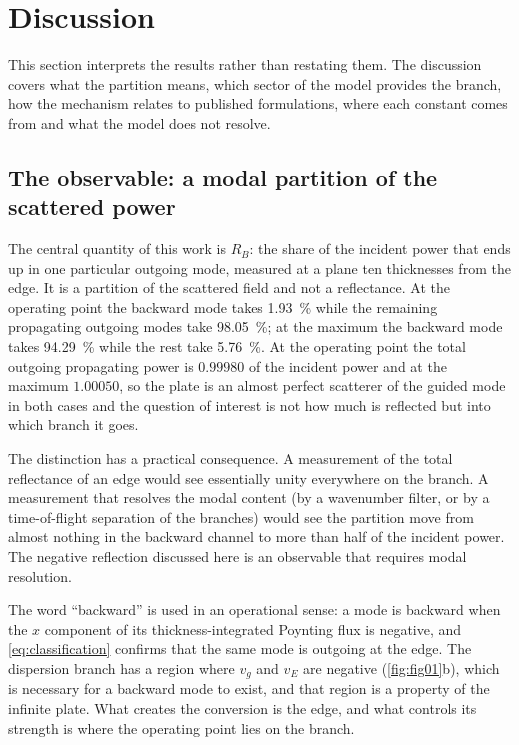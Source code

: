 \section{Discussion}
\label{sec:discussion}

This section interprets the results rather than restating them.  The discussion covers what the partition means, which sector of the model provides the branch, how the
mechanism relates to published formulations, where each constant comes from and
what the model does not resolve.

\subsection{The observable: a modal partition of the scattered power}
\label{sec:disc_meaning}

The central quantity of this work is $R_B$: the share of the incident
power that ends up in one particular outgoing mode, measured at a plane ten
thicknesses from the edge.  It is a partition of the scattered field and not a reflectance.  At the operating point the backward mode takes
\SI{1.93}{\percent} while the remaining propagating outgoing modes take
\SI{98.05}{\percent}; at the maximum the backward mode takes
\SI{94.29}{\percent} while the rest take \SI{5.76}{\percent}.  At the operating
point the total outgoing propagating power is $0.99980$ of the incident power
and at the maximum $1.00050$, so the plate is an almost perfect scatterer of the
guided mode in both cases and the question of interest is not how much is reflected but into which branch it goes.

The distinction has a practical consequence.  A measurement of the total
reflectance of an edge would see essentially unity everywhere on the branch.  A
measurement that resolves the modal content (by a wavenumber filter, or by a
time-of-flight separation of the branches) would see the partition move from
almost nothing in the backward channel to more than half of the incident power.
The negative reflection discussed here is an observable that requires modal
resolution.

The word ``backward'' is used in an operational sense: a mode is backward when
the $x$ component of its thickness-integrated Poynting flux is negative, and
\eqref{eq:classification} confirms that the same mode is outgoing at the edge.
The dispersion branch has a region where $v_g$ and $v_E$ are negative
(\cref{fig:fig01}b), which is necessary for a backward mode to exist, and that
region is a property of the infinite plate.  What creates the conversion is the
edge, and what controls its strength is where the operating point lies on the branch.

